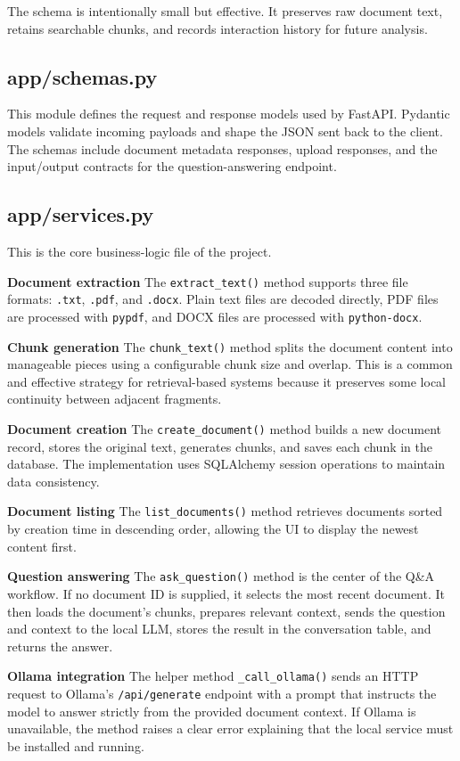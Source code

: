 ﻿\documentclass[11pt,a4paper]{article}
\begin{document}
The schema is intentionally small but effective. It preserves raw document text, retains searchable chunks, and records interaction history for future analysis.

\subsection{app/schemas.py}
This module defines the request and response models used by FastAPI. Pydantic models validate incoming payloads and shape the JSON sent back to the client. The schemas include document metadata responses, upload responses, and the input/output contracts for the question-answering endpoint.

\subsection{app/services.py}
This is the core business-logic file of the project.

\textbf{Document extraction}
The \texttt{extract\_text()} method supports three file formats: \texttt{.txt}, \texttt{.pdf}, and \texttt{.docx}. Plain text files are decoded directly, PDF files are processed with \texttt{pypdf}, and DOCX files are processed with \texttt{python-docx}.

\textbf{Chunk generation}
The \texttt{chunk\_text()} method splits the document content into manageable pieces using a configurable chunk size and overlap. This is a common and effective strategy for retrieval-based systems because it preserves some local continuity between adjacent fragments.

\textbf{Document creation}
The \texttt{create\_document()} method builds a new document record, stores the original text, generates chunks, and saves each chunk in the database. The implementation uses SQLAlchemy session operations to maintain data consistency.

\textbf{Document listing}
The \texttt{list\_documents()} method retrieves documents sorted by creation time in descending order, allowing the UI to display the newest content first.

\textbf{Question answering}
The \texttt{ask\_question()} method is the center of the Q\&A workflow. If no document ID is supplied, it selects the most recent document. It then loads the document's chunks, prepares relevant context, sends the question and context to the local LLM, stores the result in the conversation table, and returns the answer.

\textbf{Ollama integration}
The helper method \texttt{\_call\_ollama()} sends an HTTP request to Ollama's \texttt{/api/generate} endpoint with a prompt that instructs the model to answer strictly from the provided document context. If Ollama is unavailable, the method raises a clear error explaining that the local service must be installed and running.
\end{document}
